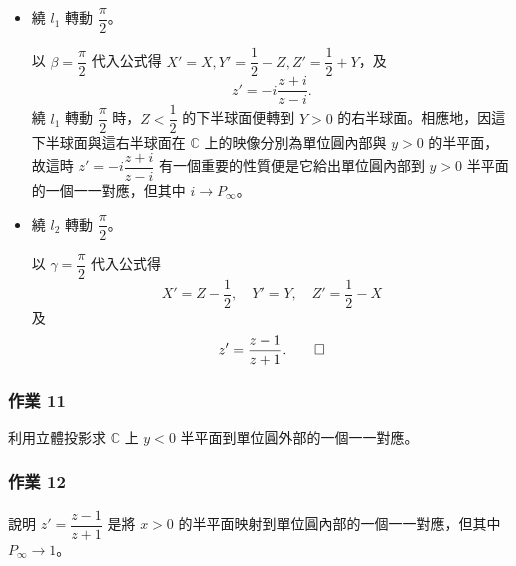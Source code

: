\begin{example}
\begin{itemize}
  \item[(i)] 繞 $l_1$ 轉動 $\dfrac{\pi}{2}$。
  \begin{solution}
  以 $\beta=\dfrac{\pi}{2}$ 代入公式得 $X'=X, Y'=\dfrac{1}{2}-Z, Z'=\dfrac{1}{2}+Y$，及
  \[
  z' = -i\frac{z+i}{z-i}.
  \]
  繞 $l_1$ 轉動 $\dfrac{\pi}{2}$ 時，$Z<\dfrac{1}{2}$ 的下半球面便轉到 $Y>0$ 的右半球面。相應地，因這下半球面與這右半球面在 $\mathbb{C}$ 上的映像分別為單位圓內部與 $y>0$ 的半平面，故這時 $z'=-i\dfrac{z+i}{z-i}$ 有一個重要的性質便是它給出單位圓內部到 $y>0$ 半平面的一個一一對應，但其中 $i \longrightarrow P_\infty$。 \qedhere
  \end{solution}

  \item[(ii)] 繞 $l_2$ 轉動 $\dfrac{\pi}{2}$。
  \begin{solution}
  以 $\gamma=\dfrac{\pi}{2}$ 代入公式得
  \[
  X'=Z-\frac{1}{2}, \quad Y'=Y, \quad Z'=\frac{1}{2}-X
  \]
  及
  \[
  z' = \frac{z-1}{z+1}. \qedhere
  \]
  \end{solution}
\end{itemize}
\end{example}

\subsubsection*{作業 11}
利用立體投影求 $\mathbb{C}$ 上 $y<0$ 半平面到單位圓外部的一個一一對應。


\subsubsection*{作業 12}
說明 $z' = \dfrac{z-1}{z+1}$ 是將 $x>0$ 的半平面映射到單位圓內部的一個一一對應，但其中 $P_\infty \longrightarrow 1$。


